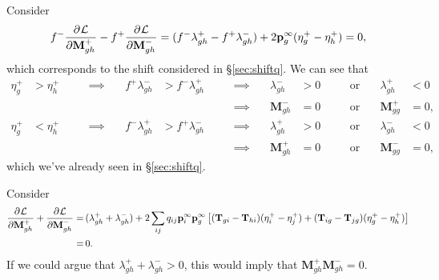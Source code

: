 \documentclass[12pt]{article}
\newcommand{\M}{\mathbf{M}}
\newcommand{\pp}{\mathbf{p}^\infty}
\newcommand{\T}{\mathbf{T}}
\begin{document}
Consider
%
\begin{equation}\label{eq:derivsshiftq}
  f^- \pdiff{\CL}{\M^+_{gh}} - f^+ \pdiff{\CL}{\M^-_{gh}}
   = (f^- \lambda^+_{gh} - f^+ \lambda^-_{gh}) + 2\pp_g (\eta^+_g - \eta^+_h)
   = 0,
\end{equation}
%
which corresponds to the shift considered in \S\ref{sec:shiftq}. We can see that
%
\begin{equation}\label{eq:etalambdaineq}
  \begin{aligned}
    \eta^+_g &> \eta^+_h
    &\quad & \implies \quad&
    f^+ \lambda^-_{gh} &> f^- \lambda^+_{gh}
    &\quad & \implies \quad&
    \lambda^-_{gh} &> 0
    &\quad & \text{or} \quad&
    \lambda^+_{gh} &< 0
    \\ &&&&&
    &\quad & \implies \quad&
    \M^-_{gh} &= 0
    &\quad & \text{or} \quad&
    \M^+_{gg} &= 0,
    \\
    \eta^+_g &< \eta^+_h
    &\quad & \implies \quad&
    f^- \lambda^+_{gh} &> f^+ \lambda^-_{gh}
    &\quad & \implies \quad&
    \lambda^+_{gh} &> 0
    &\quad & \text{or} \quad&
    \lambda^-_{gh} &< 0
    \\ &&&&&
    &\quad & \implies \quad&
    \M^+_{gh} &= 0
    &\quad & \text{or} \quad&
    \M^-_{gg} &= 0,
  \end{aligned}
\end{equation}
%
which we've already seen in \S\ref{sec:shiftq}.

Consider
%
\begin{equation}\label{eq:derivsoverlap}
 \begin{aligned}
   \pdiff{\CL}{\M^+_{gh}} + \pdiff{\CL}{\M^-_{gh}}
   =&\, (\lambda^+_{gh} + \lambda^-_{gh})
       +  2 \sum_{ij} q_{ij} \pp_i \pp_g \brk{
         (\T_{gi}-\T_{hi})(\eta^+_{i}-\eta^+_{j}) +
         (\T_{ig}-\T_{jg})(\eta^+_{g}-\eta^+_{h}) }\\
    =& \, 0.
 \end{aligned}
\end{equation}
%
If we could argue that $\lambda^+_{gh} + \lambda^-_{gh} > 0$, this would imply that $\M^+_{gh}\M^-_{gh}=0$.












\end{document}
